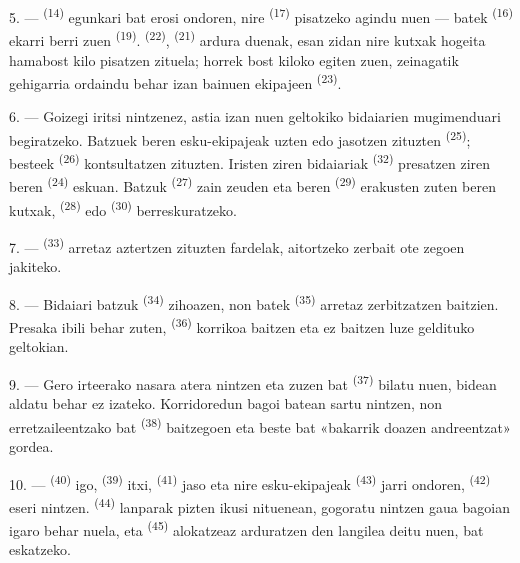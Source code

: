 \VUsaut{3.0mm}

5. ---  \textsuperscript{(14)} egunkari bat erosi ondoren,
nire  \textsuperscript{(17)} pisatzeko agindu nuen ---
 batek \textsuperscript{(16)} ekarri berri zuen
 \textsuperscript{(19)}. 
\textsuperscript{(22)},  \textsuperscript{(21)} ardura
duenak, esan zidan nire kutxak hogeita hamabost kilo pisatzen
zituela; horrek bost kiloko  egiten zuen, zeinagatik gehigarria
ordaindu behar izan bainuen ekipajeen 
\textsuperscript{(23)}.

6. --- Goizegi iritsi nintzenez, astia izan nuen geltokiko bidaiarien mugimenduari
begiratzeko. Batzuek beren esku-ekipajeak uzten edo jasotzen zituzten
 \textsuperscript{(25)}; besteek 
\textsuperscript{(26)} kontsultatzen zituzten. Iristen ziren bidaiariak
 \textsuperscript{(32)} presatzen ziren beren 
\textsuperscript{(24)} eskuan. Batzuk 
\textsuperscript{(27)} zain zeuden eta beren 
\textsuperscript{(29)} erakusten zuten beren kutxak, 
\textsuperscript{(28)} edo  \textsuperscript{(30)}
berreskuratzeko.

7. ---  \textsuperscript{(33)} arretaz aztertzen
zituzten fardelak, aitortzeko zerbait ote zegoen jakiteko.

8. --- Bidaiari batzuk  \textsuperscript{(34)} zihoazen, non
 batek \textsuperscript{(35)} arretaz zerbitzatzen baitzien.
Presaka ibili behar zuten,  \textsuperscript{(36)} korrikoa
baitzen eta ez baitzen luze geldituko geltokian.

9. --- Gero irteerako nasara atera nintzen eta  zuzen bat
\textsuperscript{(37)} bilatu nuen, bidean aldatu behar ez izateko. Korridoredun
bagoi batean sartu nintzen, non erretzaileentzako  bat
\textsuperscript{(38)} baitzegoen eta beste bat «bakarrik doazen andreentzat»
gordea.

\VUsaut{3.0mm}

10. ---  \textsuperscript{(40)} igo, 
\textsuperscript{(39)} itxi,  \textsuperscript{(41)} jaso eta
nire esku-ekipajeak  \textsuperscript{(43)} jarri ondoren,
 \textsuperscript{(42)} eseri nintzen. 
\textsuperscript{(44)} lanparak pizten ikusi nituenean, gogoratu nintzen gaua
bagoian igaro behar nuela, eta  \textsuperscript{(45)}
alokatzeaz arduratzen den langilea deitu nuen, bat eskatzeko.

